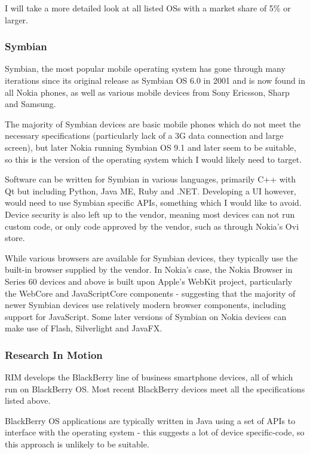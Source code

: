 \documentclass[a4papert,11pt,notitlepage]{ltxdoc}
\begin{document}
I will take a more detailed look at all listed OSs with a market share of 5\% or larger. 

\subsubsection{Symbian}
Symbian, the most popular mobile operating system has gone through many iterations since its original release as Symbian OS 6.0 in 2001 and is now found in all Nokia phones, as well as various mobile devices from Sony Ericsson, Sharp and Samsung.

The majority of Symbian devices are basic mobile phones which do not meet the necessary specifications (particularly lack of a 3G data connection and large screen), but later Nokia running Symbian OS 9.1 and later seem to be suitable, so this is the version of the operating system which I would likely need to target.

Software can be written for Symbian in various languages, primarily C++ with Qt but including Python, Java ME, Ruby and .NET. Developing a UI however, would need to use Symbian specific APIs, something which I would like to avoid. Device security is also left up to the vendor, meaning most devices can not run custom code, or only code approved by the vendor, such as through Nokia's Ovi store.

While various browsers are available for Symbian devices, they typically use the built-in browser supplied by the vendor. In Nokia's case, the Nokia Browser in Series 60 devices and above is built upon Apple's WebKit project\cite{nokia:browser}, particularly the WebCore and JavaScriptCore components - suggesting that the majority of newer Symbian devices use relatively modern browser components, including support for JavaScript. Some later versions of Symbian on Nokia devices can make use of Flash, Silverlight and JavaFX.

\subsubsection{Research In Motion}
RIM develops the BlackBerry line of business smartphone devices, all of which run on BlackBerry OS. Most recent BlackBerry devices meet all the specifications listed above.

BlackBerry OS applications are typically written in Java using a set of APIs to interface with the operating system - this suggests a lot of device specific-code, so this approach is unlikely to be suitable.
\end{document}

